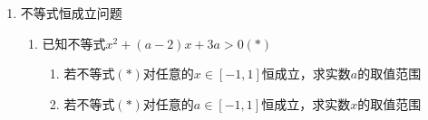 \begin{enumerate}
\begin{enumerate}
        \begin{jieda}
        \end{jieda}
        \item 设$a>0, b>0, a+b = 1$，则下列结论不正确的是
        \begin{jieda}
            \begin{enumerate}[A.]
                \item $\sqrt{ab} \leq \dfrac{a+b}{2} \Longrightarrow ab \leq \dfrac{1}{4}$，（$a = b = \dfrac{1}{2}$时取等）
                \item $\sqrt{\dfrac{a^2+b^2}{2}} \geq \dfrac{a+b}{2} \Longrightarrow a^2+b^2 \geq \dfrac{1}{2}$（$a = b = \dfrac{1}{2}$时取等）
                \item $\dfrac{4}{a} + \dfrac{1}{b} = (\dfrac{4}{a} + \dfrac{1}{b}) \cdot (a+b) = 5 + \dfrac{4b}{a} + \dfrac{a}{b} \geq 5 + 2\sqrt{4} = 9$（$a = \dfrac{2}{3}, b = \dfrac{1}{3}$时取等）
                \item $\dfrac{\sqrt{a} + \sqrt{b}}{2} \leq \sqrt{\dfrac{a+b}{2}}$，故$\sqrt{a} + \sqrt{b} \leq \sqrt{2}$
            \end{enumerate}
        \end{jieda}
    \end{enumerate}
    \item 不等式恒成立问题
    \begin{enumerate}
        \item 已知不等式$x^2+(a-2)x+3a>0(*)$
        \begin{enumerate}
            \item 若不等式$(*)$对任意的$x \in [-1, 1]$恒成立，求实数$a$的取值范围
            \item 若不等式$(*)$对任意的$a \in [-1, 1]$恒成立，求实数$x$的取值范围

\end{enumerate}
\end{enumerate}
\end{enumerate}
